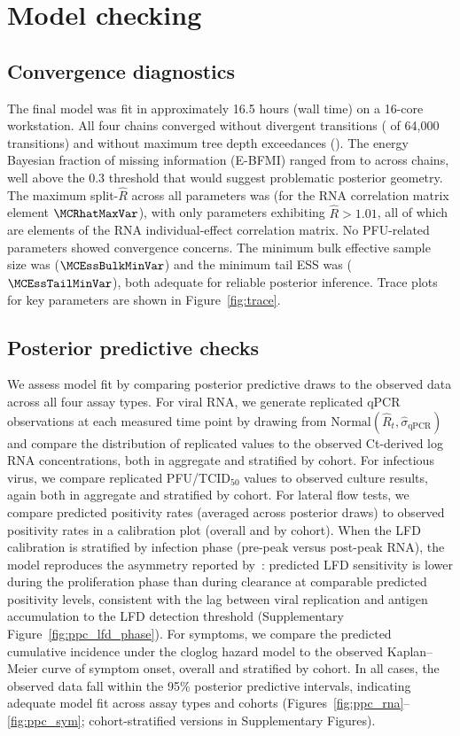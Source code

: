 \documentclass[12pt]{article}
\begin{document}
\section{Model checking} \label{sec:model_checking}

\subsection{Convergence diagnostics}
The final model was fit in approximately 16.5 hours (wall time) on a 16-core workstation. All four chains converged without divergent transitions (\MCNDivergent{} of 64{,}000 transitions) and without maximum tree depth exceedances (\MCNMaxTreeDepth{}). The energy Bayesian fraction of missing information (E-BFMI) ranged from \MCEBFMIMin{} to \MCEBFMIMax{} across chains, well above the 0.3 threshold that would suggest problematic posterior geometry. The maximum split-$\hat{R}$ across all parameters was \MCRhatMax{} (for the RNA correlation matrix element $\MCRhatMaxVar$), with only \MCNRhatGTOneOhOne{} parameters exhibiting $\hat{R} > 1.01$, all of which are elements of the RNA individual-effect correlation matrix. No PFU-related parameters showed convergence concerns. The minimum bulk effective sample size was \MCEssBulkMin{} ($\MCEssBulkMinVar$) and the minimum tail ESS was \MCEssTailMin{} ($\MCEssTailMinVar$), both adequate for reliable posterior inference. Trace plots for key parameters are shown in Figure~\ref{fig:trace}.

\subsection{Posterior predictive checks}
We assess model fit by comparing posterior predictive draws to the observed data across all four assay types. For viral RNA, we generate replicated qPCR observations at each measured time point by drawing from $\text{Normal}(\hat{R}_t, \hat{\sigma}_{\text{qPCR}})$ and compare the distribution of replicated values to the observed Ct-derived log RNA concentrations, both in aggregate and stratified by cohort. For infectious virus, we compare replicated PFU/TCID$_{50}$ values to observed culture results, again both in aggregate and stratified by cohort. For lateral flow tests, we compare predicted positivity rates (averaged across posterior draws) to observed positivity rates in a calibration plot (overall and by cohort). When the LFD calibration is stratified by infection phase (pre-peak versus post-peak RNA), the model reproduces the asymmetry reported by~\cite{hakki2022onset}: predicted LFD sensitivity is lower during the proliferation phase than during clearance at comparable predicted positivity levels, consistent with the lag between viral replication and antigen accumulation to the LFD detection threshold (Supplementary Figure~\ref{fig:ppc_lfd_phase}). For symptoms, we compare the predicted cumulative incidence under the cloglog hazard model to the observed Kaplan--Meier curve of symptom onset, overall and stratified by cohort. In all cases, the observed data fall within the 95\% posterior predictive intervals, indicating adequate model fit across assay types and cohorts (Figures~\ref{fig:ppc_rna}--\ref{fig:ppc_sym}; cohort-stratified versions in Supplementary Figures).
\end{document}
